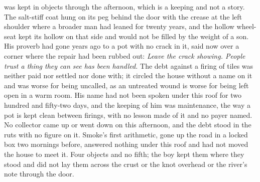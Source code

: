  was kept in objects through the afternoon, which is a keeping and not a story. The salt-stiff coat hung on its peg behind the door with the crease at the left shoulder where a broader man had leaned for twenty years, and the hollow wheel-seat kept its hollow on that side and would not be filled by the weight of a son. His proverb had gone years ago to a pot with no crack in it, said now over a corner where the repair had been rubbed out: \emph{Leave the crack showing. People trust a thing they can see has been handled.} The debt against a firing of tiles was neither paid nor settled nor done with; it circled the house without a name on it and was worse for being uncalled, as an untreated wound is worse for being left open in a warm room. His name had not been spoken under this roof for two hundred and fifty-two days, and the keeping of him was maintenance, the way a pot is kept clean between firings, with no lesson made of it and no payer named. No collector came up or went down  on this afternoon, and the debt stood in the ruts with no figure on it. Smoke's first arithmetic, gone up the road in a locked box two mornings before, answered nothing under this roof and had not moved the house to meet it. Four objects and no fifth; the boy kept them where they stood and did not lay them across the crust or the knot overhead or the river's note through the door.

\scenebreak

